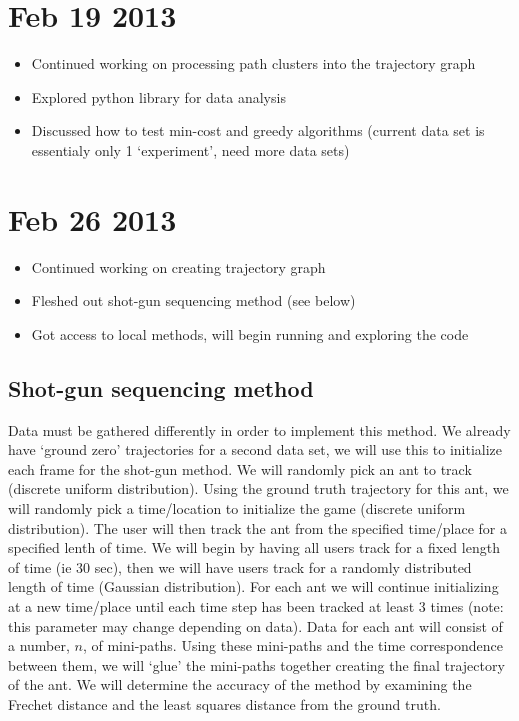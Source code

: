 \documentclass[12pt]{article}
\begin{document}
\section{Feb 19 2013}
\begin{itemize}
 \item Continued working on processing path clusters into the trajectory graph
 \item Explored python library for data analysis
 \item Discussed how to test min-cost and greedy algorithms (current data set is essentialy only 1 `experiment', need more data sets)
\end{itemize}

\section{Feb 26 2013}
\begin{itemize}
 \item Continued working on creating trajectory graph
 \item Fleshed out shot-gun sequencing method (see below)
 \item Got access to local methods, will begin running and exploring the code
\end{itemize}
\subsection{Shot-gun sequencing method}
  Data must be gathered differently in order to implement this method. We already have `ground zero' trajectories for a second data set, we will use 
this to initialize each frame for the shot-gun method. We will randomly pick an ant to track (discrete uniform distribution). Using the ground truth
trajectory for this ant, we will randomly pick a time/location to initialize the game (discrete uniform distribution). The user will then track the ant from the specified time/place for 
a specified lenth of time. We will begin by having all users track for a fixed length of time (ie 30 sec), then we will have users track for a randomly
distributed length of time (Gaussian distribution). For each ant we will continue initializing at a new time/place until each time step has been tracked at least 3 times (note:
this parameter may change depending on data). Data for each ant will consist of a number, $n$, of mini-paths. Using these mini-paths and the time 
correspondence between them, we will `glue' the mini-paths together creating the final trajectory of the ant. We will determine the accuracy of the method by 
examining the Frechet distance and the least squares distance from the ground truth.
\end{document}

